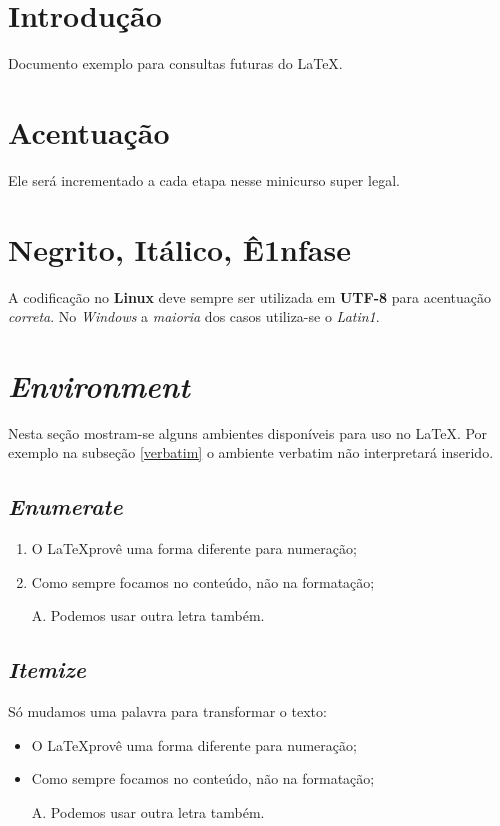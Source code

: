 \documentclass{article}
\begin{document}
	\section{Introdução}
		Documento exemplo para consultas futuras do \LaTeX.

	\section{Acentuação}		
		Ele será incrementado a cada etapa nesse minicurso super legal.
	
	\section{Negrito, Itálico, Ê1nfase}
		A codificação no \textbf{Linux} deve \huge sempre \normalsize ser utilizada em \textbf{UTF-8} para acentuação \emph{correta}. No \textit{Windows} a \emph{maioria} dos casos utiliza-se o \textit{Latin1}.
		
	\section{\textit{Environment}}
		Nesta seção mostram-se alguns ambientes disponíveis para uso no \LaTeX. Por exemplo na subseção \ref{verbatim} o ambiente \textsf{verbatim} não interpretará inserido.

		\subsection{\textit{Enumerate}}
			\begin{enumerate}
				\item	O \LaTeX provê uma forma diferente para numeração;
				\item	Como sempre focamos no conteúdo, não na formatação;
				\item[A.]	Podemos usar outra letra também.
			\end{enumerate}
	
		\subsection{\textit{Itemize}}
			Só mudamos uma palavra para transformar o texto:
			\begin{itemize}
				\item	O \LaTeX provê uma forma diferente para numeração;
				\item	Como sempre focamos no conteúdo, não na formatação;
				\item[A.]	Podemos usar outra letra também.
			\end{itemize}
	
\end{document}
